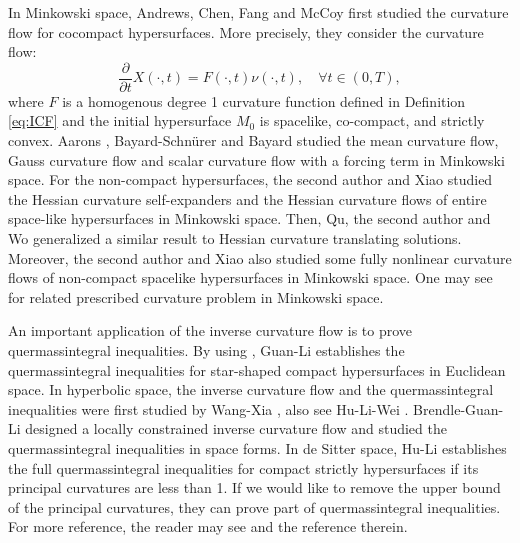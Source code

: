 \documentclass[reqno]{amsart}
\theoremstyle{remark}
\newcommand{\pd}[2]{\frac{\partial {#1}}{\partial {#2}}}
\theoremstyle{definition}
\numberwithin{equation}{section}
\begin{document}
In Minkowski space, Andrews, Chen, Fang and McCoy \cite{co-compact} first studied the curvature flow for cocompact hypersurfaces. More precisely, they consider the curvature flow:   
$$\pd{}{t}X(\cdot,t) = F(\cdot,t)\nu(\cdot,t),\quad \forall t\in (0,T), $$
 where $F$ is a homogenous degree 1 curvature function defined in Definition  \ref{eq:ICF}     
 and the initial hypersurface $M_0$ is spacelike, co-compact, and strictly convex. Aarons \cite{Aa}, Bayard-Schn\"{u}rer \cite{BS09} and Bayard \cite{B09} studied the mean curvature flow, Gauss curvature flow and scalar curvature flow with a forcing term in Minkowski space. For the non-compact hypersurfaces, the second author and Xiao \cite{WX22-1,WX22-2} studied the Hessian curvature self-expanders and the Hessian curvature flows of entire space-like hypersurfaces in Minkowski space. Then, Qu, the second author and Wo \cite{QWW24}  generalized a similar result to Hessian curvature translating solutions. Moreover, the second author and Xiao \cite{WX212} also studied some fully nonlinear curvature flows of non-compact spacelike hypersurfaces in Minkowski space. One may see \cite{RenWX19, RenWX20, WX20,WX21} for related prescribed curvature problem in Minkowski space.  

An important application of the inverse curvature flow is to prove quermassintegral inequalities. By using  \cite{Ger, Ur}, Guan-Li \cite{Guan2009} establishes the quermassintegral inequalities for star-shaped compact hypersurfaces in Euclidean space.  
In hyperbolic space, the inverse curvature flow and 
the quermassintegral inequalities were first studied by Wang-Xia \cite{WXia}, also see Hu-Li-Wei \cite{HLWei}. 
Brendle-Guan-Li \cite{BGL}  designed a locally constrained inverse curvature flow and studied the quermassintegral inequalities in space forms. In de Sitter space, Hu-Li \cite{HuLi} establishes the full quermassintegral inequalities for compact strictly hypersurfaces if its principal curvatures are less than 1. If we would like to remove the upper bound of the principal curvatures, they can prove part of quermassintegral inequalities. For more reference, the reader
may see \cite{CPLS, Sch, MaK, MaK2} and the reference therein.
\end{document}
